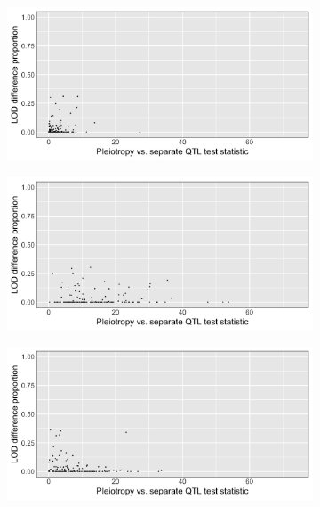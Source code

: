 \documentclass{article}
\begin{document}
\begin{figure}
\begin{subfigure}[t]{.38\textwidth}
\caption{}\label{fig:fig_e}
\end{subfigure}
\begin{subfigure}[t]{.38\textwidth}
\centering
\vspace{0pt}%
\includegraphics[width=\linewidth]{bar_6.jpg}
\caption{}\label{fig:fig_f}
\end{subfigure}
\begin{subfigure}[t]{.38\textwidth}
\centering
\vspace{0pt}%
\includegraphics[width=\linewidth]{bar_7.jpg}
\caption{}\label{fig:fig_g}
\end{subfigure}
\begin{subfigure}[t]{.38\textwidth}
\centering
\vspace{0pt}%
\includegraphics[width=\linewidth]{bar_8.jpg}

\end{subfigure}
\end{figure}
\end{document}
